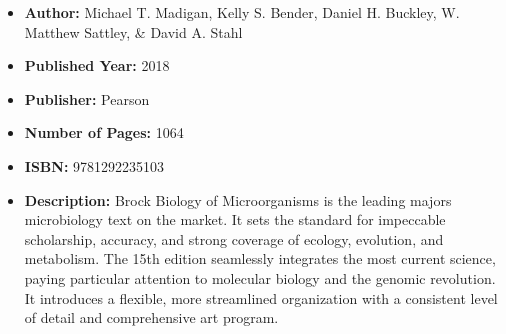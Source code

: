 \documentclass{tufte-handout}
\begin{document}
\begin{itemize}
    \item[] \textbf{Author:} Michael T. Madigan, Kelly S. Bender, Daniel H. Buckley, W. Matthew Sattley, \& David A. Stahl
    \item[] \textbf{Published Year:} 2018
    \item[] \textbf{Publisher:} Pearson
    \item[] \textbf{Number of Pages:} 1064      
    \item[] \textbf{ISBN:} 9781292235103
    \item[] \textbf{Description:} Brock Biology of Microorganisms is the leading majors microbiology text on the market. It sets the standard for impeccable scholarship, accuracy, and strong coverage of ecology, evolution, and metabolism. The 15th edition seamlessly integrates the most current science, paying particular attention to molecular biology and the genomic revolution. It introduces a flexible, more streamlined organization with a consistent level of detail and comprehensive art program.
\end{itemize}
\end{document}
